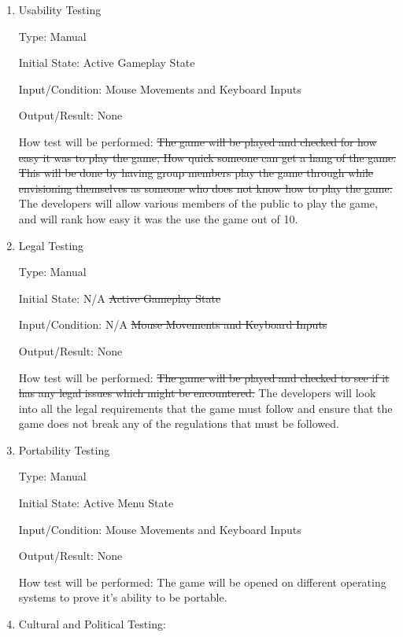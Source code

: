 \documentclass[12pt, titlepage]{article}
\newcommand{\rev}[1]{\textcolor{RevisionColour}{#1}}
\begin{document}
\begin{enumerate}

\item{Usability Testing\\}

Type: Manual
					
Initial State: Active Gameplay State
					
Input/Condition: Mouse Movements and Keyboard Inputs
					
Output/Result: None
					
How test will be performed: \sout{The game will be played and checked for how easy it was to play the game; How quick someone can get a hang of the game. This will be done by having group members play the game through while envisioning themselves as someone who does not know how to play the game.}
\rev{The developers will allow various members of the public to play the game, and will rank how easy it was the use the game out of 10.}
					

\item{Legal Testing\\}

Type: Manual
					
Initial State: \rev{N/A} \sout{Active Gameplay State}
					
Input/Condition: \rev{N/A} \sout{Mouse Movements and Keyboard Inputs}
					
Output/Result: None
					
How test will be performed: \sout{The game will be played and checked to see if it has any legal issues which might be encountered.} \rev{The developers will look into all the legal requirements that the game must follow and ensure that the game does not break any of the regulations that must be followed.}

\item{Portability Testing\\}

Type: Manual
					
Initial State: Active Menu State
					
Input/Condition: Mouse Movements and Keyboard Inputs
					
Output/Result: None
					
How test will be performed: The game will be opened on different operating systems to prove it's ability to be portable. 

\item{\rev{Cultural and Political Testing:}\

}
\end{enumerate}
\end{document}
